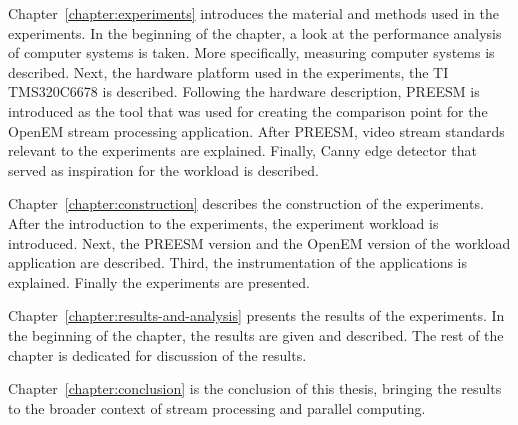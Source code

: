 Chapter~\ref{chapter:experiments} introduces the material and methods used in the experiments. In the beginning of the chapter, a look at the performance analysis of computer systems is taken. More specifically, measuring computer systems is described. Next, the hardware platform used in the experiments, the TI TMS320C6678 is described. Following the hardware description, PREESM is introduced as the tool that was used for creating the comparison point for the OpenEM stream processing application. After PREESM, video stream standards relevant to the experiments are explained. Finally, Canny edge detector that served as inspiration for the workload is described.

Chapter~\ref{chapter:construction} describes the construction of the experiments. After the introduction to the experiments, the experiment workload is introduced. Next, the PREESM version and the OpenEM version of the workload application are described. Third, the instrumentation of the applications is explained. Finally the experiments are presented.

Chapter~\ref{chapter:results-and-analysis} presents the results of the experiments. In the beginning of the chapter, the results are given and described. The rest of the chapter is dedicated for discussion of the results.

Chapter~\ref{chapter:conclusion} is the conclusion of this thesis, bringing the results to the broader context of stream processing and parallel computing.
